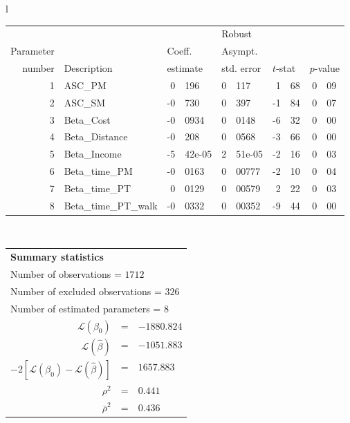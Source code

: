   \begin{tabular}{l}
\begin{tabular}{rlr@{.}lr@{.}lr@{.}lr@{.}l}
         &                       &   \multicolumn{2}{l}{}    & \multicolumn{2}{l}{Robust}  &     \multicolumn{4}{l}{}   \\
Parameter &                       &   \multicolumn{2}{l}{Coeff.}      & \multicolumn{2}{l}{Asympt.}  &     \multicolumn{4}{l}{}   \\
number &  Description                     &   \multicolumn{2}{l}{estimate}      & \multicolumn{2}{l}{std. error}  &   \multicolumn{2}{l}{$t$-stat}  &   \multicolumn{2}{l}{$p$-value}   \\

\hline

1 & ASC_PM  & 0&196 & 0&117 & 1&68 & 0&09\\
2 & ASC_SM & -0&730 & 0&397 & -1&84 & 0&07\\
3 & Beta_Cost & -0&0934 & 0&0148 & -6&32 & 0&00\\
4 & Beta_Distance & -0&208 & 0&0568 & -3&66 & 0&00\\
5 & Beta_Income & -5&42e-05 & 2&51e-05 & -2&16 & 0&03\\
6 & Beta_time_PM & -0&0163 & 0&00777 & -2&10 & 0&04\\
7 & Beta_time_PT & 0&0129 & 0&00579 & 2&22 & 0&03\\
8 & Beta_time_PT_walk & -0&0332 & 0&00352 & -9&44 & 0&00\\
\hline
\end{tabular}
\\
\begin{tabular}{rcl}
\multicolumn{3}{l}{\bf Summary statistics}\\
\multicolumn{3}{l}{ Number of observations = $1712$} \\
\multicolumn{3}{l}{ Number of excluded observations = $326$} \\
\multicolumn{3}{l}{ Number of estimated  parameters = $8$} \\
 $\mathcal{L}(\beta_0)$ &=&  $-1880.824$ \\
 $\mathcal{L}(\hat{\beta})$ &=& $-1051.883 $  \\
 $-2[\mathcal{L}(\beta_0) -\mathcal{L}(\hat{\beta})]$ &=& $1657.883$ \\
    $\rho^2$ &=&   $0.441$ \\
    $\bar{\rho}^2$ &=&    $0.436$ \\
\end{tabular}
  \end{tabular}
